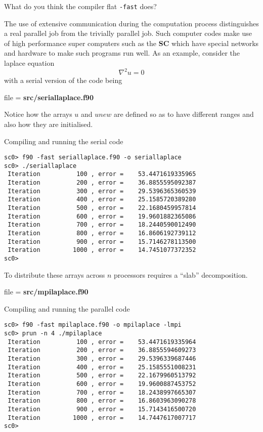 \documentclass[12pt,a4paper,oneside,openany]{report}
\newcommand{\fcode}[1]{\par \small file = \textbf{#1}  \normalsize}
\newcommand{\code}[1]{\texttt{#1}}
\newcommand{\SC}{\textbf{SC} }
\begin{document}
What do you think the compiler flat \code{-fast} does?

\newpage

The use of extensive communication during the computation process distinguishes a real parallel job from the trivially parallel job.  Such computer codes make use of high performance super computers such as the \SC which have special networks and hardware to make such programs run well.  As an example, consider the laplace equation
\begin{equation}
\nabla^{2} u = 0
\end{equation}
with a serial version of the code being

\fcode{src/seriallaplace.f90}

Notice how the arrays $u$ and $unew$ are defined so as to have different ranges and also how they are initialised.

Compiling and running the serial code
\begin{verbatim}
sc0> f90 -fast seriallaplace.f90 -o seriallaplace
sc0> ./seriallaplace 
 Iteration          100 , error =    53.4471619335965     
 Iteration          200 , error =    36.8855595092387     
 Iteration          300 , error =    29.5396365360539     
 Iteration          400 , error =    25.1585720389280     
 Iteration          500 , error =    22.1680459957814     
 Iteration          600 , error =    19.9601882365086     
 Iteration          700 , error =    18.2440590012490     
 Iteration          800 , error =    16.8606192739112     
 Iteration          900 , error =    15.7146278113500     
 Iteration         1000 , error =    14.7451077372352     
sc0> 
\end{verbatim}

\newpage

To distribute these arrays across $n$ processors requires a ``slab'' decomposition.

\fcode{src/mpilaplace.f90}

\newpage

Compiling and running the parallel code
\begin{verbatim}
sc0> f90 -fast mpilaplace.f90 -o mpilaplace -lmpi
sc0> prun -n 4 ./mpilaplace
 Iteration          100 , error =    53.4471619335964     
 Iteration          200 , error =    36.8855594609273     
 Iteration          300 , error =    29.5396339687446     
 Iteration          400 , error =    25.1585551008231     
 Iteration          500 , error =    22.1679960513792     
 Iteration          600 , error =    19.9600887453752     
 Iteration          700 , error =    18.2438997665307     
 Iteration          800 , error =    16.8603963090278     
 Iteration          900 , error =    15.7143416500720     
 Iteration         1000 , error =    14.7447617007717     
sc0> 
\end{verbatim}
\end{document}
